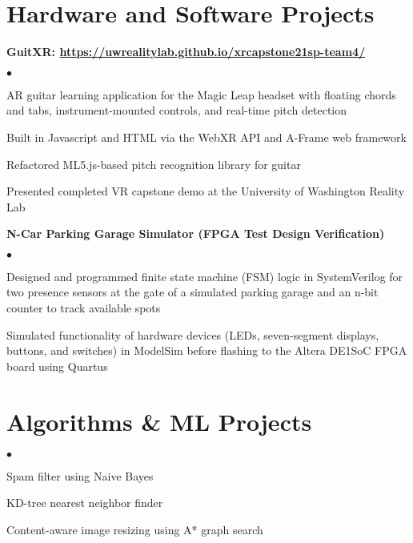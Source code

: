 \documentclass[margin,line]{res}
\newenvironment{list2}{
  \begin{list}{$\bullet$}{%
      \setlength{\itemsep}{0in}
      \setlength{\parsep}{0in} \setlength{\parskip}{0in}
      \setlength{\topsep}{0in} \setlength{\partopsep}{0in} 
      \setlength{\leftmargin}{0.2in}}}{\end{list}}
\begin{document}
\begin{resume}
\section{\sc Hardware and Software Projects}

{\bf GuitXR: \url{https://uwrealitylab.github.io/xrcapstone21sp-team4/}} %
\begin{list2}
\item AR guitar learning application for the Magic Leap headset with floating chords and tabs, instrument-mounted controls, and real-time pitch detection
\item Built in Javascript and HTML via the WebXR API and A-Frame web framework
\item Refactored ML5.js-based pitch recognition library for guitar
\item Presented completed VR capstone demo at the University of Washington Reality Lab
\end{list2}

{\bf N-Car Parking Garage Simulator (FPGA Test Design Verification)}
\begin{list2}
\item Designed and programmed finite state machine (FSM) logic in SystemVerilog for two presence sensors at the gate of a simulated parking garage and an n-bit counter to track available spots
\item Simulated functionality of hardware devices (LEDs, seven-segment displays, buttons, and switches) in ModelSim before flashing to the Altera DE1{\textunderscore}SoC FPGA board using Quartus
\end{list2}


\section{\sc Algorithms \& ML Projects}
		\begin{list2}
    \item Spam filter using Naive Bayes
    \item KD-tree nearest neighbor finder
    \item Content-aware image resizing using A* graph search
    \end{list2}

\end{resume}
\end{document}
